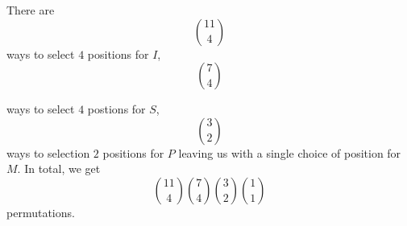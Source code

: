 There are \[\binom{11}{4}\] ways to select $4$ positions for $I$, \[\binom{7}{4}\]

ways to select $4$ postions for $S$, \[\binom{3}{2}\] ways to selection $2$ 
positions for $P$ leaving us with a single choice of position for $M$. In total, 
we get
\[\binom{11}{4}\binom{7}{4}\binom{3}{2}\binom{1}{1}\] permutations.